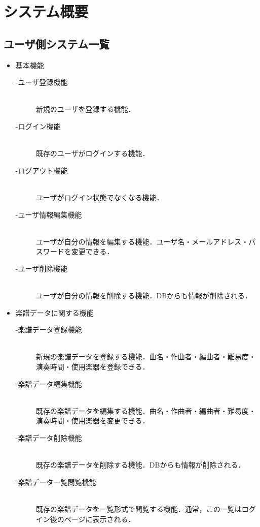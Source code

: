 \chapter{システム概要}
\vspace{-1cm}
\section{ユーザ側システム一覧}
\begin{itemize}
    \item 基本機能
    \begin{description}
        \item[-ユーザ登録機能]\mbox{}\\
            新規のユーザを登録する機能． 
        \item[-ログイン機能] \mbox{}\\
            既存のユーザがログインする機能．
        \item[-ログアウト機能] \mbox{}\\
            ユーザがログイン状態でなくなる機能．
        \item[-ユーザ情報編集機能] \mbox{}\\
            ユーザが自分の情報を編集する機能．ユーザ名・メールアドレス・パスワードを変更できる．
        \item[-ユーザ削除機能] \mbox{}\\
            ユーザが自分の情報を削除する機能．DBからも情報が削除される．
    \end{description}
    \item 楽譜データに関する機能
    \begin{description}
        \item[-楽譜データ登録機能] \mbox{}\\
            新規の楽譜データを登録する機能．曲名・作曲者・編曲者・難易度・演奏時間・使用楽器を登録できる．
        \item[-楽譜データ編集機能] \mbox{}\\
            既存の楽譜データを編集する機能．曲名・作曲者・編曲者・難易度・演奏時間・使用楽器を変更できる．
        \item[-楽譜データ削除機能] \mbox{}\\
            既存の楽譜データを削除する機能．DBからも情報が削除される．
        \item[-楽譜データ一覧閲覧機能] \mbox{}\\
            既存の楽譜データを一覧形式で閲覧する機能．通常，この一覧はログイン後のページに表示される．

\end{description}
\end{itemize}
